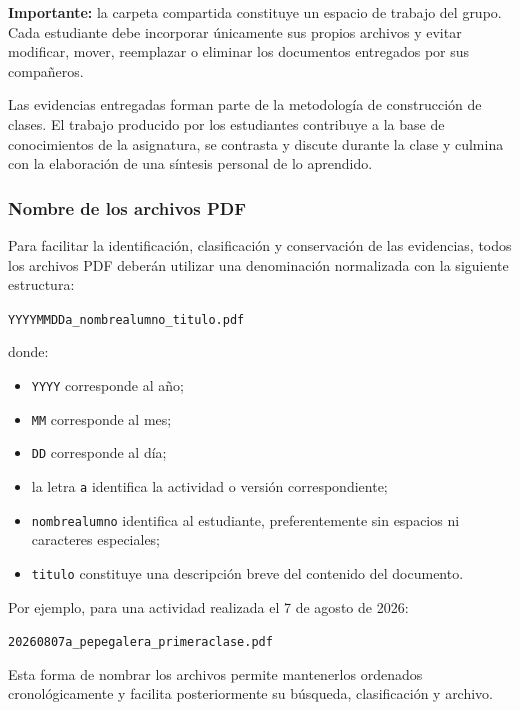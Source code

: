 \documentclass[10pt]{article}
\begin{document}
\textbf{Importante:} la carpeta compartida constituye un espacio de trabajo
del grupo. Cada estudiante debe incorporar únicamente sus propios archivos
y evitar modificar, mover, reemplazar o eliminar los documentos entregados
por sus compañeros.

Las evidencias entregadas forman parte de la metodología de construcción
de clases. El trabajo producido por los estudiantes contribuye a la base
de conocimientos de la asignatura, se contrasta y discute durante la clase
y culmina con la elaboración de una síntesis personal de lo aprendido.


\subsubsection{Nombre de los archivos PDF}

Para facilitar la identificación, clasificación y conservación de las
evidencias, todos los archivos PDF deberán utilizar una denominación
normalizada con la siguiente estructura:

\begin{center}
\texttt{YYYYMMDDa\_nombrealumno\_titulo.pdf}
\end{center}

donde:

\begin{itemize}
    \item \texttt{YYYY} corresponde al año;
    \item \texttt{MM} corresponde al mes;
    \item \texttt{DD} corresponde al día;
    \item la letra \texttt{a} identifica la actividad o versión correspondiente;
    \item \texttt{nombrealumno} identifica al estudiante, preferentemente sin
          espacios ni caracteres especiales;
    \item \texttt{titulo} constituye una descripción breve del contenido del
          documento.
\end{itemize}

Por ejemplo, para una actividad realizada el 7 de agosto de 2026:

\begin{center}
\texttt{20260807a\_pepegalera\_primeraclase.pdf}
\end{center}

Esta forma de nombrar los archivos permite mantenerlos ordenados
cronológicamente y facilita posteriormente su búsqueda, clasificación y
archivo.
\end{document}
